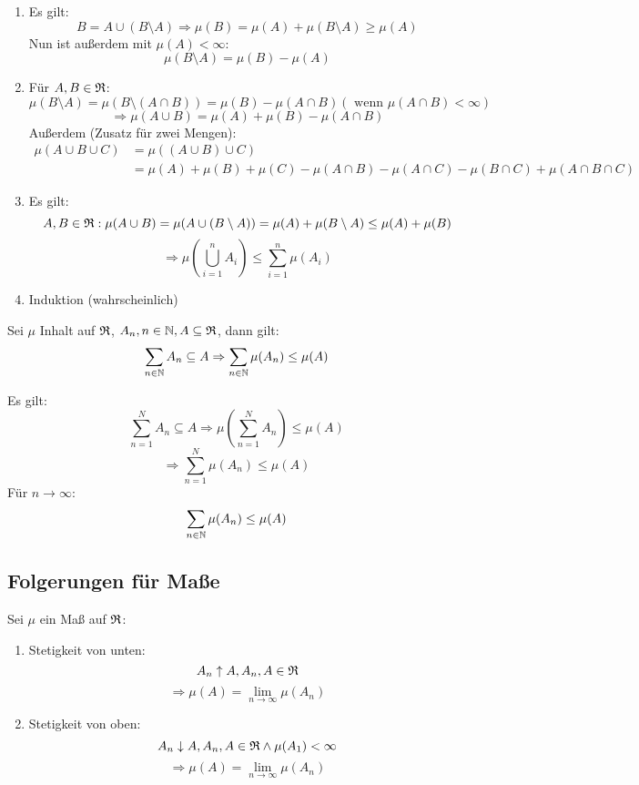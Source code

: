 		\begin{bew}
			\begin{enumerate}
				\item Es gilt:
				\[ B=A\cup (B\setminus A)\Rightarrow \mu(B)=\mu(A)+\mu(B\setminus A)\ge \mu(A) \]
				Nun ist außerdem mit $\mu(A)<\infty$:
				\[ \mu(B\setminus A)=\mu(B)-\mu(A) \]
				\item
				Für $A,B\in\mathfrak{R}$:
				\[ \mu(B\setminus A)=\mu(B\setminus (A\cap B))=\mu(B)-\mu(A\cap B) (\text{ wenn }\mu(A\cap B)<\infty) \]
				\[ \Rightarrow \mu(A\cup B)=\mu(A)+\mu(B)-\mu(A\cap B) \]
				Außerdem (Zusatz für zwei Mengen):
				\begin{align*} \mu(A\cup B\cup C)&=\mu((A\cup B)\cup C)\\&=\mu(A)+\mu(B)+\mu(C)-\mu(A\cap B)-\mu(A\cap C)-\mu(B\cap C)+\mu(A\cap B\cap C) \end{align*}
				\item Es gilt:
				\[ A,B\in\mathfrak{R}: \mu(A\cup B)=\mu(A\cup (B\setminus A))=\mu(A)+\mu(B\setminus A)\le \mu(A)+\mu(B) \]
				\[ \Rightarrow \mu\left(\bigcup_{i=1}^n A_i\right)\le \sum_{i=1}^n \mu(A_i) \]
				\item Induktion (wahrscheinlich)
			\end{enumerate}
		\end{bew}
		\begin{satz}
			Sei $\mu$ Inhalt auf $\mathfrak{R}$, $A_n, n\in\mathbb{N}, A\subseteq\mathfrak{R}$, dann gilt:
			\[ \sum_{n\in\mathbb{N}} A_n\subseteq A\Rightarrow \sum_{n\in\mathbb{N}}\mu(A_n)\le \mu(A) \]
		\end{satz}
		\begin{bew}
			Es gilt:
			\[ \sum_{n=1}^N A_n\subseteq A\Rightarrow \mu\left(\sum_{n=1}^N A_n\right) \le \mu(A) \]
			\[ \Rightarrow \sum_{n=1}^N \mu(A_n)\le \mu(A) \]
			Für $n\to\infty$:
			\[ \sum_{n\in\mathbb{N}} \mu(A_n)\le \mu(A) \]
		\end{bew}
		
		\subsection{Folgerungen für Maße}
		
		\begin{satz}
			Sei $\mu$ ein Maß auf $\mathfrak{R}$:
			\begin{enumerate}
				\item Stetigkeit von unten:
				\[ A_n\uparrow A, A_n, A\in\mathfrak{R} \]
				\[ \Rightarrow \mu(A)=\lim_{n\to\infty} \mu(A_n) \]
				\item Stetigkeit von oben:
				\[ A_n\downarrow A, A_n, A\in\mathfrak{R}\land \mu(A_1)<\infty \]
				\[ \Rightarrow \mu(A)=\lim_{n\to\infty} \mu(A_n) \]
			\end{enumerate}
		\end{satz}
			
